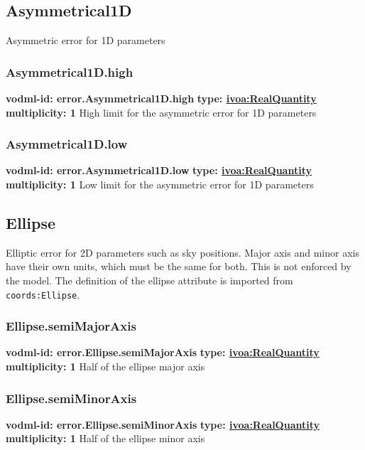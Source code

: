   \subsection{Asymmetrical1D}
    \label{sect:error.Asymmetrical1D}
    Asymmetric error for 1D parameters

    \subsubsection{Asymmetrical1D.high}
    \textbf{vodml-id: error.Asymmetrical1D.high} \newline
    \textbf{type: \hyperref[sect:ivoa]{ivoa:RealQuantity}} \newline
    \textbf{multiplicity: 1} \newline
    High limit for the asymmetric error for 1D parameters

    \subsubsection{Asymmetrical1D.low}
    \textbf{vodml-id: error.Asymmetrical1D.low} \newline
    \textbf{type: \hyperref[sect:ivoa]{ivoa:RealQuantity}} \newline
    \textbf{multiplicity: 1} \newline
    Low limit for the asymmetric error for 1D parameters

  \subsection{Ellipse}
    \label{sect:error.Ellipse}
    Elliptic error for 2D parameters such as sky positions. Major axis and minor axis have their own units, which must be the same for both. This is not enforced by the model. The definition of the ellipse attribute is imported from \texttt{coords:Ellipse}.

    \subsubsection{Ellipse.semiMajorAxis}
    \textbf{vodml-id: error.Ellipse.semiMajorAxis} \newline
    \textbf{type: \hyperref[sect:ivoa]{ivoa:RealQuantity}} \newline
    \textbf{multiplicity: 1} \newline
    Half of the ellipse major axis

    \subsubsection{Ellipse.semiMinorAxis}
    \textbf{vodml-id: error.Ellipse.semiMinorAxis} \newline
    \textbf{type: \hyperref[sect:ivoa]{ivoa:RealQuantity}} \newline
    \textbf{multiplicity: 1} \newline
    Half of the ellipse minor axis

